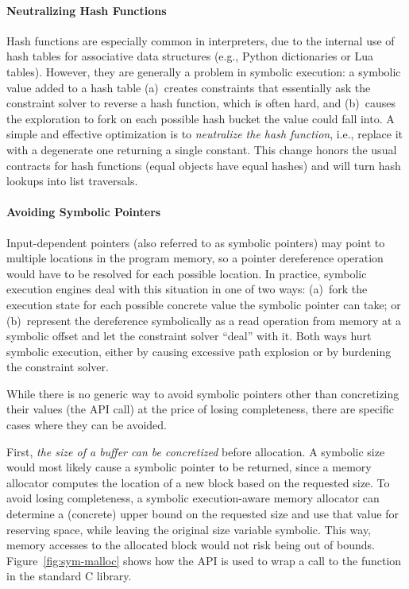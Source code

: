 \paragraph{Neutralizing Hash Functions}

Hash functions are especially common in interpreters, due to the internal use of hash tables for associative data structures (e.g., Python dictionaries or Lua tables).  However, they are generally a problem in symbolic execution: a symbolic value added to a hash table (a)~creates constraints that essentially ask the constraint solver to reverse a hash function, which is often hard, and (b)~causes the exploration to fork on each possible hash bucket the value could fall into.
%
A simple and effective optimization is to \emph{neutralize the hash function}, i.e., replace it with a degenerate one returning a single constant. This change honors the usual contracts for hash functions (equal objects have equal hashes) and will turn hash lookups into list traversals.

\paragraph{Avoiding Symbolic Pointers}

Input-dependent pointers (also referred to as symbolic pointers) may point to multiple locations in the program memory, so a pointer dereference operation would have to be resolved for each possible location.  In practice, symbolic execution engines deal with this situation in one of two ways:
%
(a)~fork the execution state for each possible concrete value the symbolic pointer can take; or
%
(b)~represent the dereference symbolically as a read operation from memory at a symbolic offset and let the constraint solver ``deal'' with it.
%
Both ways hurt symbolic execution, either by causing excessive path explosion or by burdening the constraint solver.

While there is no generic way to avoid symbolic pointers other than concretizing their values (the  API call) at the price of losing completeness, there are specific cases where they can be avoided.

First, \emph{the size of a buffer can be concretized} before allocation.  A symbolic size would most likely cause a symbolic pointer to be returned, since a memory allocator computes the location of a new block based on the requested size.  To avoid losing completeness, a symbolic execution-aware memory allocator can determine a (concrete) upper bound on the requested size and use that value for reserving space, while leaving the original size variable symbolic.  This way, memory accesses to the allocated block would not risk being out of bounds.  Figure~\ref{fig:sym-malloc} shows how the \chef API is used to wrap a call to the  function in the standard C library.

